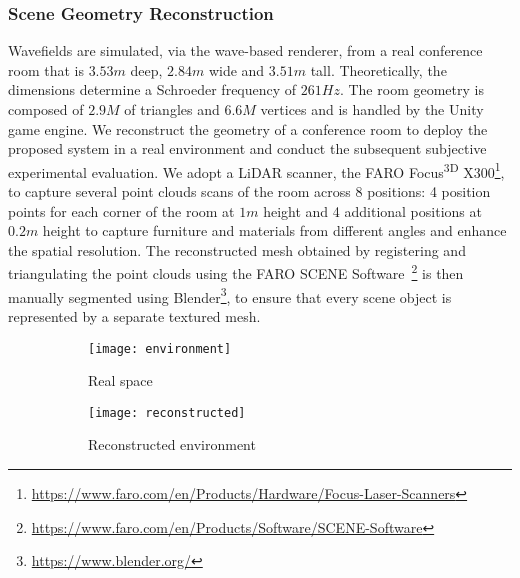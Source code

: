 \subsubsection{Scene Geometry Reconstruction}
Wavefields are simulated, via the wave-based renderer, from a real conference room that is $3.53m$ deep, $2.84m$ wide and $3.51m$ tall. Theoretically, the dimensions determine a Schroeder frequency of $261Hz$. The room geometry is composed of $2.9M$ of triangles and $6.6M$ vertices and is handled by the Unity game engine.
We reconstruct the geometry of a conference room to deploy the proposed system in a real environment and conduct the subsequent subjective experimental evaluation. We adopt a LiDAR scanner, the FARO Focus\textsuperscript{3D} X300\footnote{\url{https://www.faro.com/en/Products/Hardware/Focus-Laser-Scanners}}, to capture several point clouds scans of the room across 8 positions: 4 position points for each corner of the room at $1m$ height and 4 additional positions at $0.2m$ height to capture furniture and materials from different angles and enhance the spatial resolution. The reconstructed mesh obtained by registering and triangulating the point clouds using the FARO SCENE Software~\footnote{\url{https://www.faro.com/en/Products/Software/SCENE-Software}} is then manually segmented using Blender\footnote{\url{https://www.blender.org/}}, to ensure that every scene object is represented by a separate textured mesh.
\begin{figure}
    \centering
    \begin{subfigure}[t]{0.49\textwidth}
       \centering
       \texttt{[image: environment]}
       \caption{Real space}
       \label{fig:chi-input-env}
    \end{subfigure}
    \begin{subfigure}[t]{0.49\textwidth}
       \centering
       \texttt{[image: reconstructed]}
       \caption{Reconstructed environment}
       \label{fig:chi-reconstructed-env}
    \end{subfigure}
\caption[Texture-based system evaluation --- Environment reconstruction process]{}
\label{fig:chi-scanning}
\end{figure}

